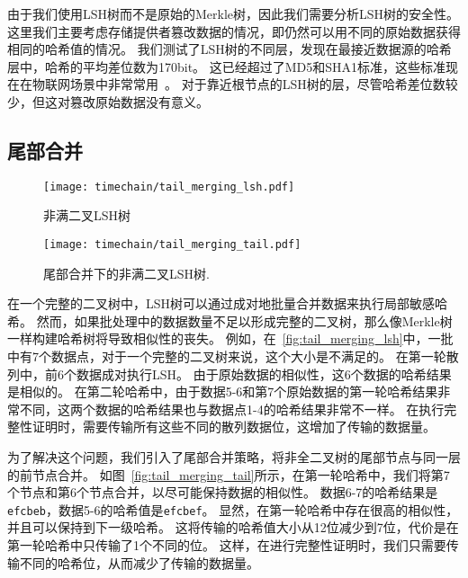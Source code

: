 由于我们使用LSH树而不是原始的Merkle树，因此我们需要分析LSH树的安全性。
这里我们主要考虑存储提供者篡改数据的情况，即仍然可以用不同的原始数据获得相同的哈希值的情况。
我们测试了LSH树的不同层，发现在最接近数据源的哈希层中，哈希的平均差位数为170bit。
这已经超过了MD5和SHA1标准，这些标准现在在物联网场景中非常常用~\cite{chi2017hashing,landge2018secured}。
对于靠近根节点的LSH树的层，尽管哈希差位数较少，但这对篡改原始数据没有意义。

\subsection{尾部合并}

\begin{figure}[t]
    \centering
	\begin{minipage}{0.8\linewidth}
        \centering
        \texttt{[image: timechain/tail\_merging\_lsh.pdf]}
        \caption{非满二叉LSH树}
        \label{fig:tail_merging_lsh}
	\end{minipage}
\end{figure}

\begin{figure}[t]
    \centering
	\begin{minipage}{0.8\linewidth}
        \centering
        \texttt{[image: timechain/tail\_merging\_tail.pdf]}
	\end{minipage}
	\caption{尾部合并下的非满二叉LSH树.}
	\label{fig:tail_merging_tail}
\end{figure}

在一个完整的二叉树中，LSH树可以通过成对地批量合并数据来执行局部敏感哈希。
然而，如果批处理中的数据数量不足以形成完整的二叉树，那么像Merkle树一样构建哈希树将导致相似性的丧失。
例如，在~\autoref{fig:tail_merging_lsh}中，一批中有7个数据点，对于一个完整的二叉树来说，这个大小是不满足的。
在第一轮散列中，前6个数据成对执行LSH。
由于原始数据的相似性，这6个数据的哈希结果是相似的。
在第二轮哈希中，由于数据5-6和第7个原始数据的第一轮哈希结果非常不同，这两个数据的哈希结果也与数据点1-4的哈希结果非常不一样。
在执行完整性证明时，需要传输所有这些不同的散列数据位，这增加了传输的数据量。

为了解决这个问题，我们引入了尾部合并策略，将非全二叉树的尾部节点与同一层的前节点合并。
如图~\autoref{fig:tail_merging_tail}所示，在第一轮哈希中，我们将第7个节点和第6个节点合并，以尽可能保持数据的相似性。
数据6-7的哈希结果是\texttt{efcbeb}，数据5-6的哈希值是\texttt{efcbef}。
显然，在第一轮哈希中存在很高的相似性，并且可以保持到下一级哈希。
这将传输的哈希值大小从12位减少到7位，代价是在第一轮哈希中只传输了1个不同的位。
这样，在进行完整性证明时，我们只需要传输不同的哈希位，从而减少了传输的数据量。

